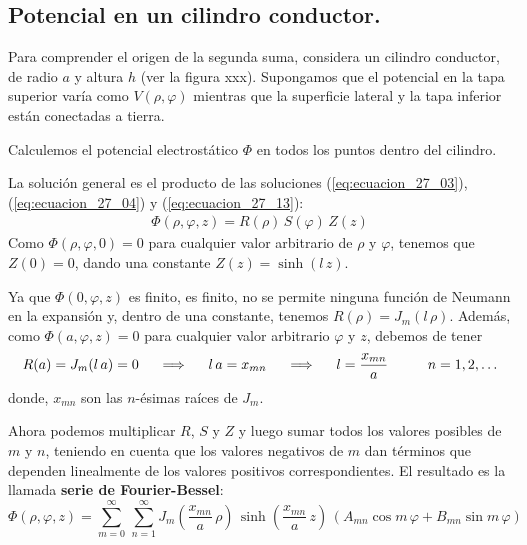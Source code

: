 \subsection{Potencial en un cilindro conductor.}
Para comprender el origen de la segunda suma, considera un cilindro conductor, de radio $a$ y altura $h$ (ver la figura xxx). Supongamos que el potencial en la tapa superior varía como $V (\rho, \varphi)$ mientras que la superficie lateral y la tapa inferior están conectadas a tierra.
\par
Calculemos el potencial electrostático $\Phi$ en todos los puntos dentro del cilindro.
\par
La solución general es el producto de las soluciones (\ref{eq:ecuacion_27_03}), (\ref{eq:ecuacion_27_04}) y (\ref{eq:ecuacion_27_13}):
\begin{align*}
\Phi (\rho, \varphi, z) = R(\rho) \, S(\varphi) \, Z(z)
\end{align*}
Como $\Phi (\rho, \varphi, 0) = 0$ para cualquier valor arbitrario de $\rho$ y $\varphi$, tenemos que $Z(0) = 0$, dando una constante $Z(z) = \sinh (l \, z)$.
\par
Ya que $\Phi (0, \varphi, z)$ es finito, es finito, no se permite ninguna función de Neumann en la expansión y, dentro de una constante, tenemos $R(\rho) = J_{m}(l \, \rho)$. Además, como $\Phi (a, \varphi, z) = 0$ para cualquier valor arbitrario $\varphi$ y $z$, debemos de tener
\begin{align*}
R(a) = J_{m} (l \, a) = 0 \hspace{0.5cm} \Longrightarrow \hspace{0.5cm} l \, a = x_{mn} \hspace{0.5cm} \Longrightarrow \hspace{0.5cm} l = \dfrac{x_{mn}}{a} \hspace{1cm} n = 1, 2, \ldots
\end{align*}
donde, $x_{mn}$ son las $n$-ésimas raíces de $J_{m}$.
\par
Ahora podemos multiplicar $R$, $S$ y $Z$ y luego sumar todos los valores posibles de $m$ y $n$, teniendo en cuenta que los valores negativos de $m$ dan términos que dependen linealmente de los valores positivos correspondientes. El resultado es la llamada \textbf{serie de Fourier-Bessel}:
\begin{equation}
\Phi (\rho, \varphi, z) = \sum_{m=0}^{\infty} \, \sum_{n=1}^{\infty} J_{m} \left( \dfrac{x_{mn}}{a}  \, \rho \right) \, \sinh \left( \dfrac{x_{mn}}{a}  \, z \right) \, (A_{mn} \cos m \, \varphi + B_{mn} \sin m \, \varphi )
\label{eq:ecuacion_27_39}
\end{equation}
